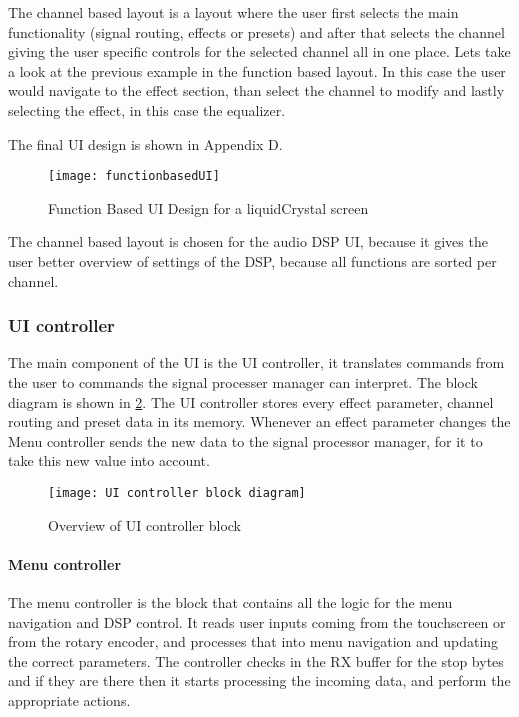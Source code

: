 The channel based layout is a layout where the user first selects the main functionality (signal routing, effects or presets) and after that selects the channel giving the user specific controls for the selected channel all in one place. Lets take a look at the previous example in the function based layout. In this case the user would navigate to the effect section, than select the channel to modify and lastly selecting the effect, in this case the equalizer.

The final UI design is shown in Appendix D.

\begin{figure}[ht]
    \texttt{[image: functionbasedUI]}
    \caption{Function Based UI Design for a liquidCrystal screen}
    \label{fig:functionbasedUI}
\end{figure}

The channel based layout is chosen for the audio DSP UI, because it gives the user better overview of settings of the DSP, because all functions are sorted per channel.

\subsubsection{UI controller}
The main component of the UI is the UI controller, it translates commands from the user to commands the signal processer manager can interpret. The block diagram is shown in \ref{fig:UIcontroller-block-diagram}. The UI controller stores every effect parameter, channel routing and preset data in its memory. Whenever an effect parameter changes the Menu controller sends the new data to the signal processor manager, for it to take this new value into account. 

\begin{figure}[ht]
    \texttt{[image: UI controller block diagram]}
    \caption{Overview of UI controller block}
    \label{fig:UIcontroller-block-diagram}
\end{figure}

\paragraph{Menu controller}
The menu controller is the block that contains all the logic for the menu navigation and DSP control. It reads user inputs coming from the touchscreen or from the rotary encoder, and processes that into menu navigation and updating the correct parameters. The controller checks in the RX buffer for the stop bytes and if they are there then it starts processing the incoming data, and perform the appropriate actions.

